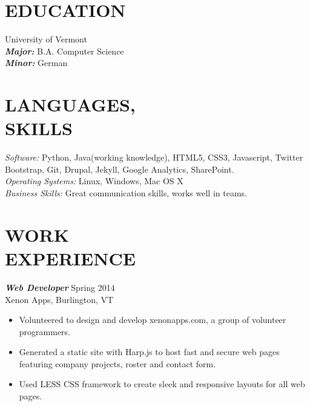 \documentclass[line,margin]{res}
\begin{document}
\address{Address: P.O. Box 154 Gaysville, VT 05746}
\address{Email: perkinsean@gmail.com Cell Phone: (802) 222-7749} 


 
\begin{resume}
 
 
\section{EDUCATION} {University of Vermont} \\
                {\sl {\bfseries Major:}}  B.A. Computer Science \\
                {\sl {\bfseries Minor:}} German  
                 
                
\section{LANGUAGES, \\ SKILLS} {\sl Software:} Python, Java(working knowledge), HTML5, CSS3, Javascript, Twitter Bootstrap, Git, Drupal, Jekyll, Google Analytics, SharePoint.  \\           
 {\sl Operating Systems:} Linux, Windows, Mac OS X \\
 {\sl Business Skills:} Great communication skills, works well in teams.\\
 
\section{WORK \\ EXPERIENCE}  {\sl {\bfseries Web Developer}} \hfill Spring 2014 \\
                Xenon Apps, Burlington, VT
                 \begin{itemize}  \itemsep -2pt 
                 \item Volunteered to design and develop xenonapps.com, a group of volunteer programmers.
                 \item Generated a static site with Harp.js to host fast and secure web pages featuring company projects, roster and contact form.
                 \item Used LESS CSS framework to create sleek and responsive layouts for all web pages.
                 \end{itemize} 


\end{resume}
\end{document}
